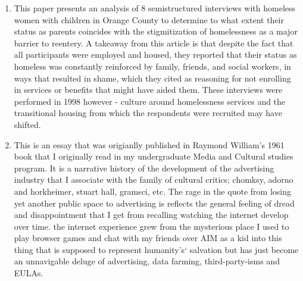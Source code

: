 \documentclass{article}
\begin{document}
\begin{enumerate}
\item \cite{takahashi2002SociospatialStigmatization} This paper
  presents an analysis of 8 semistructured interviews with homeless
  women with children in Orange County to determine to what extent
  their status as parents coincides with the stigmitization of
  homelessness as a major barrier to reentery. A takeaway from this
  article is that despite the fact that all participants were employed
  and housed, they reported that their status as homeless was
  constantly reinforced by family, friends, and social workers, in
  ways that resulted in shame, which they cited as reasoning for not
  enrolling in services or benefits that might have aided them. These
  interviews were performed in 1998 however - culture around
  homelessness services and the transitional housing from which the
  respondents were recruited may have shifted.

  
\item \cite{williams1961AdvertisingMagic} This is an essay that was
  origianlly published in Raymond William's 1961 book that I
  originally read in my undergraduate Media and Cultural studies
  program. It is a narrative history of the development of the
  advertising industry that I associate with the family of cultural
  critics; chomksy, adorno and horkheimer, stuart hall, gramsci,
  etc. The rage in the quote from losing yet another public space to
  advertising is reflects the general feeling of dread and
  disappointment that I get from recalling watching the internet
  develop over time. the internet experience grew from the mysterious
  place I used to play browser games and chat with my friends over AIM
  as a kid into this thing that is supposed to represent humanity's`
  salvation but has just become an unnavigable deluge of advertising,
  data farming, third-party-isms and EULAs.
\end{enumerate}




\end{document}
